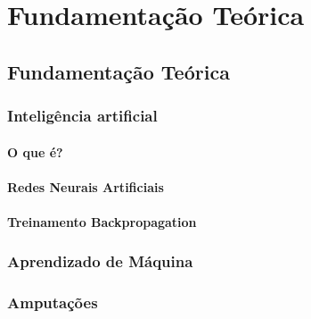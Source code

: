 \part{Fundamentação Teórica}
\chapter[Fundamentação Teórica]{Fundamentação Teórica}

\section{Inteligência artificial}
    \subsection{O que é?}
        
    \subsection{Redes Neurais Artificiais}
        
    \subsection{Treinamento Backpropagation}
        

\section{Aprendizado de Máquina}
    

\section{Amputações}